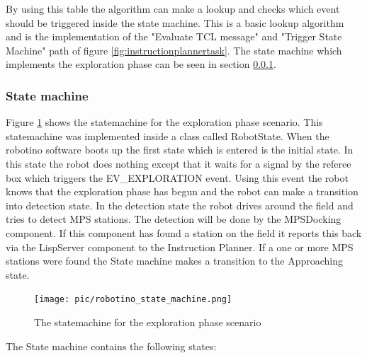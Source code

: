 \bigskip

By using this table the algorithm can make a lookup and checks which event should be triggered inside the state machine. This is a basic lookup algorithm and is the implementation of the "Evaluate TCL message" and "Trigger State Machine" path of figure \ref{fig:instructionplannertask}. The state machine which implements the exploration phase can be seen in section \ref{sec:state_machine}. 
  

\subsubsection{State machine}
\label{sec:state_machine}

Figure \ref{fig:statemachine} shows the statemachine for the exploration phase scenario. This statemachine was implemented inside a class called RobotState. When the robotino software boots up the first state which is entered is the initial state. In this state the robot does nothing except that it waits for a signal by the referee box which triggers the EV\_EXPLORATION event. Using this event the robot knows that the exploration phase has begun and the robot can make a transition into detection state. In the detection state the robot drives around the field and tries to detect MPS stations. The detection will be done by the MPSDocking component. If this component has found a station on the field it reports this back via the LispServer component to the Instruction Planner. If a one or more MPS stations were found the State machine makes a transition to the Approaching state. \\


\begin{figure}
\centering
\texttt{[image: pic/robotino\_state\_machine.png]}
\caption{The statemachine for the exploration phase scenario}
\label{fig:statemachine}
\end{figure}

\newpage


The State machine contains the following states:


